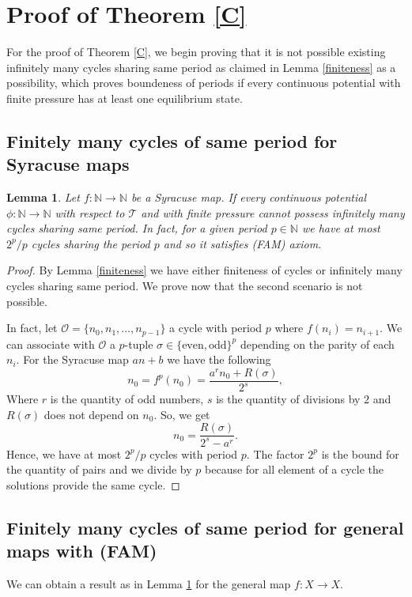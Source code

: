 \documentclass[12 pt]{amsart}
\newtheorem{lemma}[theorem]{Lemma}
\theoremstyle{definition}
\begin{document}
	\section{Proof of Theorem \ref{C}}
	For the proof of Theorem \ref{C}, we begin proving that it is not possible existing infinitely many cycles sharing same period as claimed in Lemma \ref{finiteness} as a possibility, which proves boundeness of periods if every continuous potential with finite pressure has at least one equilibrium state.
    \subsection{Finitely many cycles of same period for Syracuse maps}\begin{lemma}\label{boundcycle}
    	Let $f: \mathbb{N} \to \mathbb{N}$ be a Syracuse map. If every continuous potential $\phi : \mathbb{N} \to \mathbb{N}$ with respect to $\mathcal{T}$ and with finite pressure cannot possess infinitely many cycles sharing same period. In fact, for a given period $p \in \mathbb{N}$ we have at most $2^{p}/p$ cycles sharing the period $p$ and so it satisfies (FAM) axiom.
    \end{lemma}
	\begin{proof}
		By Lemma \ref{finiteness} we have either finiteness of cycles or infinitely many cycles sharing same period. We prove now that the second scenario is not possible.
		
		In fact, let $\mathcal{O} = \{n_{0}, n_{1}, \dots, n_{p-1}\}$ a cycle with period $p$ where $f(n_{i}) = n_{i+1}$. We can associate with $\mathcal{O}$ a $p$-tuple $\sigma \in \{\text{even},\text{odd}\}^{p}$ depending on the parity of each $n_{i}$. For the Syracuse map $an + b$ we have the following
		\[
		n_{0} = f^{p}(n_{0}) = \frac{a^{r} n_{0} + R(\sigma)}{2^{s}},
		\] 
		Where $r$ is the quantity of odd numbers, $s$ is the quantity of divisions by $2$ and $R(\sigma)$ does not depend on $n_{0}$. So, we get
		\[
		n_{0} = \frac{R(\sigma)}{2^{s} - a^{r}}.
		\]
		Hence, we have at most $2^{p}/p$ cycles with period $p$. The factor $2^{p}$ is the bound for the quantity of pairs and we divide by $p$ because for all element of a cycle the solutions provide the same cycle.
	\end{proof}
	
     
    \subsection{Finitely many cycles of same period for general maps with (FAM)}We can obtain a result as in Lemma \ref{boundcycle} for the general map $f: X \to X$.
    
\end{document}
